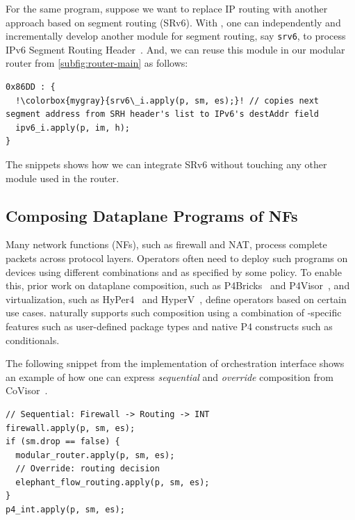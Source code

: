 \documentclass[letterpaper,twocolumn,10pt]{article}
\begin{document}
%
For the same program, suppose we want to replace IP routing with
another approach based on segment routing (SRv6). With \ulang, one can
independently and incrementally develop another module for segment
routing, say \texttt{srv6}, to process IPv6 Segment Routing
Header~\cite{srh}. And, we can reuse this module in our modular router
from \cref{subfig:router-main} as follows:

\begin{lstlisting}[frame=none, escapechar=!]
0x86DD : {
  !\colorbox{mygray}{srv6\_i.apply(p, sm, es);}! // copies next segment address from SRH header's list to IPv6's destAddr field
  ipv6_i.apply(p, im, h);
}
\end{lstlisting}
The snippets shows how we can integrate SRv6 without touching any
other module used in the router.




\subsection{Composing Dataplane Programs of NFs}
\label{subsection:composing-dataplane-programs-of-NFs}

Many network functions (NFs), such as firewall and NAT, process
complete packets across protocol layers. Operators often need to
deploy such programs on devices using different combinations and as
specified by some policy. To enable this, prior work on dataplane
composition, such as P4Bricks~\cite{soni:hal-01632431} and
P4Visor~\cite{Zheng:2018:PLV:3281411.3281436}, and virtualization,
such as HyPer4~\cite{Hancock:2016:HUP:2999572.2999607} and
HyperV~\cite{8038396}, define operators based on certain use cases.
\ulang naturally supports such composition using a combination of
\ulang-specific features such as user-defined package types and native
P4 constructs such as conditionals.

%
The following \ulang snippet from the implementation of orchestration
interface shows an example of how one can express \emph{sequential}
and \emph{override} composition from CoVisor~\cite{188954}.
\begin{lstlisting}[frame=none, escapechar=!]
// Sequential: Firewall -> Routing -> INT
firewall.apply(p, sm, es);
if (sm.drop == false) {
  modular_router.apply(p, sm, es);
  // Override: routing decision
  elephant_flow_routing.apply(p, sm, es);
}
p4_int.apply(p, sm, es);
\end{lstlisting}
\end{document}

